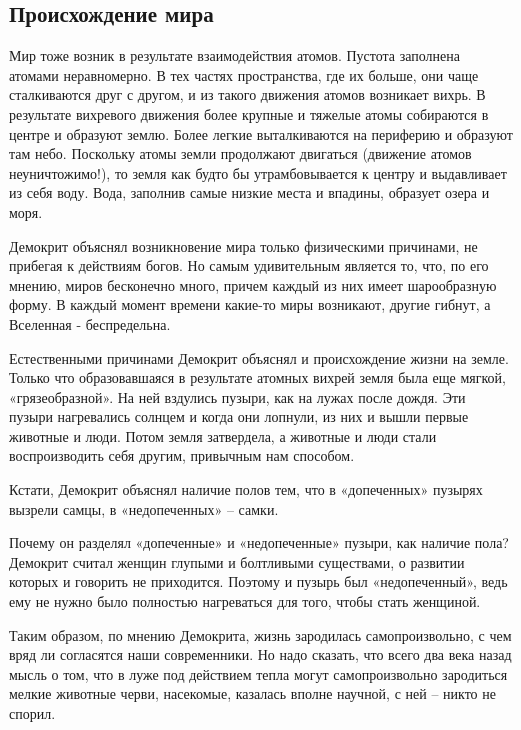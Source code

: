 \documentclass[
]{article}
\begin{document}
\hypertarget{ux43fux440ux43eux438ux441ux445ux43eux436ux434ux435ux43dux438ux435-ux43cux438ux440ux430}{%
\subsection{Происхождение
мира}\label{ux43fux440ux43eux438ux441ux445ux43eux436ux434ux435ux43dux438ux435-ux43cux438ux440ux430}}

Мир тоже возник в результате взаимодействия атомов. Пустота заполнена
атомами неравномерно. В тех частях пространства, где их больше, они чаще
сталкиваются друг с другом, и из такого движения атомов возникает вихрь.
В результате вихревого движения более крупные и тяжелые атомы собираются
в центре и образуют землю. Более легкие выталкиваются на периферию и
образуют там небо. Поскольку атомы земли продолжают двигаться (движение
атомов неуничтожимо!), то земля как будто бы утрамбовывается к центру и
выдавливает из себя воду. Вода, заполнив самые низкие места и впадины,
образует озера и моря.

Демокрит объяснял возникновение мира только физическими причинами, не
прибегая к действиям богов. Но самым удивительным является то, что, по
его мнению, миров бесконечно много, причем каждый из них имеет
шарообразную форму. В каждый момент времени какие-то миры возникают,
другие гибнут, а Вселенная - беспредельна.

Естественными причинами Демокрит объяснял и происхождение жизни на
земле. Только что образовавшаяся в результате атомных вихрей земля была
еще мягкой, «грязеобразной». На ней вздулись пузыри, как на лужах после
дождя. Эти пузыри нагревались солнцем и когда они лопнули, из них и
вышли первые животные и люди. Потом земля затвердела, а животные и люди
стали воспроизводить себя другим, привычным нам способом.

Кстати, Демокрит объяснял наличие полов тем, что в «допеченных» пузырях
вызрели самцы, в «недопеченных» -- самки.

Почему он разделял «допеченные» и «недопеченные» пузыри, как наличие
пола? Демокрит считал женщин глупыми и болтливыми существами, о развитии
которых и говорить не приходится. Поэтому и пузырь был «недопеченный»,
ведь ему не нужно было полностью нагреваться для того, чтобы стать
женщиной.

Таким образом, по мнению Демокрита, жизнь зародилась самопроизвольно, с
чем вряд ли согласятся наши современники. Но надо сказать, что всего два
века назад мысль о том, что в луже под действием тепла могут
самопроизвольно зародиться мелкие животные черви, насекомые, казалась
вполне научной, с ней -- никто не спорил.
\end{document}
